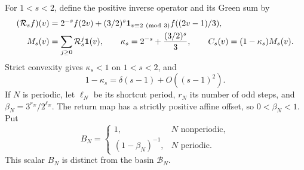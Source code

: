 For \(1<s<2\), define the positive inverse operator and its
Green sum by
\begin{align}
 (\mathcal R_s f)(v)
   &=2^{-s}f(2v)
      +(3/2)^s\mathbf1_{v\equiv2\ ({\rm mod}\ 3)}
                                f((2v-1)/3),\label{eq:ct-Rs}\\
 M_s(v)&=\sum_{j\ge0}\mathcal R_s^j\mathbf1(v),\qquad
 \kappa_s=2^{-s}+\frac{(3/2)^s}{3},\qquad
 C_s(v)=(1-\kappa_s)M_s(v).\label{eq:ct-Green-def}
\end{align}
Strict convexity gives \(\kappa_s<1\) on \(1<s<2\), and
\begin{equation}\label{eq:ct-kappa-expansion}
 1-\kappa_s=\delta(s-1)+O((s-1)^2).
\end{equation}
If \(N\) is periodic, let \(\ell_N\) be its shortcut period,
\(r_N\) its number of odd steps, and
\(\beta_N=3^{r_N}/2^{\ell_N}\). The return map has a strictly
positive affine offset, so \(0<\beta_N<1\). Put
\[
 B_N=
 \begin{cases}
 1,&N\text{ nonperiodic},\\
 (1-\beta_N)^{-1},&N\text{ periodic}.
 \end{cases}
\]
This scalar \(B_N\) is distinct from the basin \(\mathcal B_N\).

